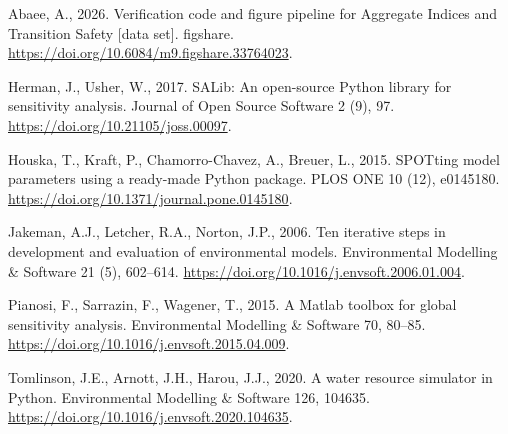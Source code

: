 \documentclass[3p,11pt]{elsarticle}
\begin{document}
\begin{thebibliography}{}
Abaee, A., 2026. Verification code and figure pipeline for Aggregate
Indices and Transition Safety [data set]. figshare.
\url{https://doi.org/10.6084/m9.figshare.33764023}.

Herman, J., Usher, W., 2017. SALib: An open-source Python library for
sensitivity analysis. Journal of Open Source Software 2 (9), 97.
\url{https://doi.org/10.21105/joss.00097}.

Houska, T., Kraft, P., Chamorro-Chavez, A., Breuer, L., 2015. SPOTting
model parameters using a ready-made Python package. PLOS ONE 10 (12),
e0145180. \url{https://doi.org/10.1371/journal.pone.0145180}.

Jakeman, A.J., Letcher, R.A., Norton, J.P., 2006. Ten iterative steps in
development and evaluation of environmental models. Environmental Modelling
\& Software 21 (5), 602--614. \url{https://doi.org/10.1016/j.envsoft.2006.01.004}.

Pianosi, F., Sarrazin, F., Wagener, T., 2015. A Matlab toolbox for global
sensitivity analysis. Environmental Modelling \& Software 70, 80--85.
\url{https://doi.org/10.1016/j.envsoft.2015.04.009}.

Tomlinson, J.E., Arnott, J.H., Harou, J.J., 2020. A water resource
simulator in Python. Environmental Modelling \& Software 126, 104635.
\url{https://doi.org/10.1016/j.envsoft.2020.104635}.

\end{thebibliography}
\end{document}
